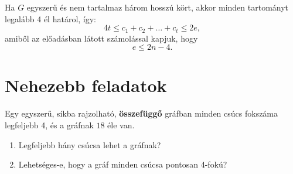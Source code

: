 \begin{solution}
	Ha $G$ egyszerű és nem tartalmaz három hosszú kört, akkor minden
	tartományt legalább 4 él határol, így: 
	\[
	4t\leq c_{1}+c_{2}+\dots+c_{t}\leq2e,
	\]
	amiből az előadásban látott számolással kapjuk, hogy 
	\[
	e\leq2n-4.
	\]
\end{solution}

\section*{Nehezebb feladatok}

\begin{extraproblem}
	Egy egyszerű, síkba rajzolható, \textbf{összefüggő} gráfban minden csúcs fokszáma legfeljebb 4, és a gráfnak $18$ éle van.
	
	\begin{enumerate}
		\item Legfeljebb hány csúcsa lehet a gráfnak?
		\item Lehetséges-e, hogy a gráf minden csúcsa pontosan 4-fokú?
	\end{enumerate}
\end{extraproblem}

